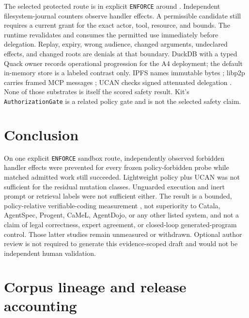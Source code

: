 \documentclass{article}
\begin{document}
The selected protected route is  in explicit \texttt{ENFORCE} around . Independent filesystem-journal counters observe handler effects. A permissible candidate still requires a current grant for the exact actor, tool, resource, and bounds. The runtime revalidates and consumes the permitted use immediately before delegation. Replay, expiry, wrong audience, changed arguments, undeclared effects, and changed roots are denials at that boundary. DuckDB with a typed Quack owner records operational progression for the A4 deployment; the default in-memory store is a labeled contrast only. IPFS names immutable bytes \citep{ipfs}; libp2p carries framed MCP messages \citep{libp2p}; UCAN checks signed attenuated delegation \citep{ucan}. None of those substrates is itself the scored safety result. Kit's \texttt{AuthorizationGate} is a related policy gate and is not the selected safety claim.




\section{Conclusion}

On one explicit \texttt{ENFORCE} sandbox route, independently observed forbidden handler effects were prevented for every frozen policy-forbidden probe while matched admitted work still succeeded. Lightweight policy plus UCAN was not sufficient for the residual mutation classes. Unguarded execution and inert prompt or retrieval labels were not sufficient either. The result is a bounded, policy-relative verifiable-coding measurement \citep{vericode2026cfp}, not superiority to Catala, AgentSpec, Progent, CaMeL, AgentDojo, or any other listed system, and not a claim of legal correctness, expert agreement, or closed-loop generated-program control. Those latter studies remain unmeasured or withdrawn. Optional author review is not required to generate this evidence-scoped draft and would not be independent human validation.\label{la-main-text-end}

\clearpage


\clearpage
\appendix

\section{Corpus lineage and release accounting}
\end{document}
